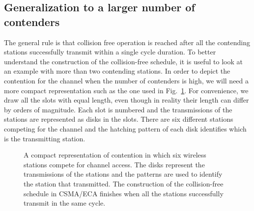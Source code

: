 \documentclass[journal]{IEEEtran}
\begin{document}
\subsection{Generalization to a larger number of contenders}
The general rule is that collision free operation is reached after all the contending stations successfully transmit within a single cycle duration.
To better understand the construction of the collision-free schedule, it is useful to look at an example with more than two contending stations.
In order to depict the contention for the channel when the number of contenders is high, we will need a more compact representation such as the one used in Fig.~\ref{fig:ca_vs_eca_compact}.
For convenience, we draw all the slots with equal length, even though in reality their length can differ by orders of magnitude.
Each slot is numbered and the transmissions of the stations are represented as disks in the slots.
There are six different stations competing for the channel and the hatching pattern of each disk identifies which is the transmitting station.

\begin{figure}[!t]
\centering
{}
\caption{A compact representation of contention in which six wireless stations compete for channel access. The disks represent the transmissions of the stations and the  patterns are used to identify the station that transmitted. The construction of the collision-free schedule in CSMA/ECA finishes when all the stations successfully transmit in the same cycle.}
\label{fig:ca_vs_eca_compact}
\end{figure}
\end{document}
